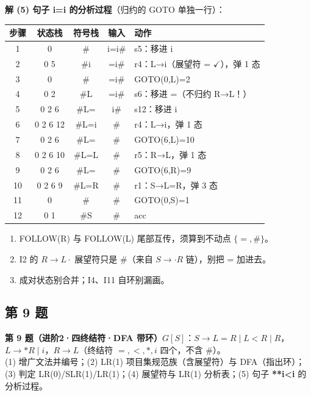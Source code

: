 \documentclass[12pt,a4paper,fontset=windows]{ctexart}
\newcommand{\ok}{\ensuremath{\checkmark}}
\begin{document}
\textbf{解 (5) 句子 i=i 的分析过程}（归约的 GOTO 单独一行）：

\begin{center}
\renewcommand{\arraystretch}{1.25}
\begin{tabular}{c c c c p{5.8cm}}
\toprule
\textbf{步骤} & \textbf{状态栈} & \textbf{符号栈} & \textbf{输入} & \textbf{动作} \\
\midrule
1 & 0 & \# & i=i\# & s5：移进 i \\
2 & 0 5 & \#i & =i\# & r4：L→i（展望符 = \ok），弹 1 态 \\
3 & 0 & \# & =i\# & GOTO(0,L)=2 \\
4 & 0 2 & \#L & =i\# & s6：移进 =（不归约 R→L！） \\
5 & 0 2 6 & \#L= & i\# & s12：移进 i \\
6 & 0 2 6 12 & \#L=i & \# & r4：L→i，弹 1 态 \\
7 & 0 2 6 & \#L= & \# & GOTO(6,L)=10 \\
8 & 0 2 6 10 & \#L=L & \# & r5：R→L，弹 1 态 \\
9 & 0 2 6 & \#L= & \# & GOTO(6,R)=9 \\
10 & 0 2 6 9 & \#L=R & \# & r1：S→L=R，弹 3 态 \\
11 & 0 & \# & \# & GOTO(0,S)=1 \\
12 & 0 1 & \#S & \# & acc \\
\bottomrule
\end{tabular}
\end{center}

\begin{warnbox}[易错]
\begin{enumerate}
\item FOLLOW(R) 与 FOLLOW(L) 尾部互传，须算到不动点 $\{=,\#\}$。
\item I2 的 $R \to L\cdot$ 展望符只是 \#（来自 $S \to \cdot R$ 链），别把 = 加进去。
\item 成对状态别合并；I4、I11 自环别漏画。
\end{enumerate}
\end{warnbox}

\subsection*{第 9 题}

\begin{qbox}
{\large\bfseries 第 9 题（进阶2·四终结符·DFA 带环）}\quad $G[S]$：$S \to L{=}R \mid L{<}R \mid R$，$L \to {*}R \mid i$，$R \to L$（终结符 $=,<,*,i$ 四个，不含 \#）。\\
(1) 增广文法并编号；(2) LR(1) 项目集规范族（含展望符）与 DFA（指出环）；(3) 判定 LR(0)/SLR(1)/LR(1)；(4) 展望符与 LR(1) 分析表；(5) 句子 \textbf{*{*}i<i} 的分析过程。
\end{qbox}
\end{document}
